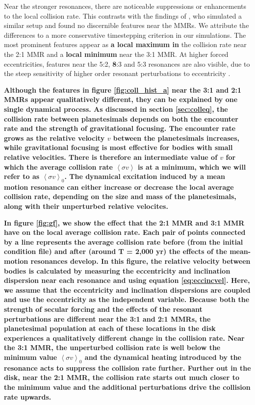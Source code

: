 \documentclass[fleqn,usenatbib]{mnras}
\begin{document}
Near the stronger resonances, there are noticeable suppressions or enhancements to the local collision rate. This contrasts with the findings of 
\citet{2000Icar..143...45R}, who simulated a similar setup and found no discernible features near the MMRs. We attribute the differences to a more 
conservative timestepping criterion in our simulations. The most prominent features appear as \textbf{a local maximum in} the collision rate near the 2:1 
MMR and a \textbf{local minimum} near the 3:1 MMR. At higher forced eccentricities, features near the 5:2, \textbf{8}:3 and 5:3 resonances are also visible, due to the 
steep sensitivity of higher order resonant perturbations to eccentricity \citep{1994PhyD...77..289M}.

\textbf{Although the features in figure \ref{fig:coll_hist_a} near the 3:1 and 2:1 MMRs appear qualitatively different, they can be explained by one single dynamical process. As discussed in section \ref{sec:colleq}, the collision rate between planetesimals depends on both the encounter rate and the strength of gravitational focusing. The encounter rate grows as the relative velocity $v$ between the planetesimals increases, while gravitational focusing is most effective for bodies with small relative velocities. There is therefore an intermediate value of $v$ for which the average collision rate $\left< \sigma v \right>$ is at a minimum, which we will refer to as  $\left< \sigma v \right>_{0}$. The dynamical excitation induced by a mean motion resonance can either increase or decrease the local average collision rate, depending on the size and mass of the planetesimals, along with their unperturbed relative velocites.}

\textbf{In figure \ref{fig:gf}, we show the effect that the 2:1 MMR and 3:1 MMR have on the local average collision rate. Each pair of points connected by a line represents the average collision rate before (from the initial condition file) and after (around T = 2,000 yr) the effects of the mean-motion resonances develop. In this figure, the relative velocity between bodies is calculated by measuring the eccentricity and inclination dispersion near each resonance and using equation \ref{eq:eccincvel}. Here, we assume that the eccentricity and inclination dispersions are coupled \citep{1993MNRAS.263..875I} and use the eccentricity as the independent variable. Because both the strength of secular forcing and the effects of the resonant perturbations are different near the 3:1 and 2:1 MMRs, the planetesimal population at each of these locations in the disk experiences a qualitatively different change in the collision rate. Near the 3:1 MMR, the unperturbed collision rate is well below the minimum value $\left< \sigma v \right>_{0}$ and the dynamical heating introduced by the resonance acts to suppress the collision rate further. Further out in the disk, near the 2:1 MMR, the collision rate starts out much closer to the minimum value and the additional perturbations drive the collision rate upwards.}
\end{document}
